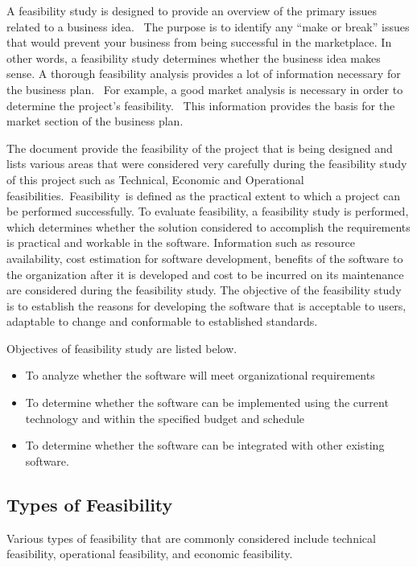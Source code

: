 A feasibility study is designed to provide an overview of the primary issues related to a business idea.  The purpose is to identify any “make or break” issues that would prevent your business from being successful in the marketplace. In other words, a feasibility study determines whether the business idea makes sense. A thorough feasibility analysis provides a lot of information necessary for the business plan.  For example, a good market analysis is necessary in order to determine the project’s feasibility.  This information provides the basis for the market section of the business plan.

The document provide the feasibility of the project that is being designed and lists various areas that were considered very carefully during the feasibility study of this project such as Technical, Economic and Operational feasibilities. Feasibility is defined as the practical extent to which a project can be performed successfully. To evaluate feasibility, a feasibility study is performed, which determines whether the solution considered to accomplish the requirements is practical and workable in the software. Information such as resource availability, cost estimation for software development, benefits of the software to the organization after it is developed and cost to be incurred on its maintenance are considered during the feasibility study. The objective of the feasibility study is to establish the reasons for developing the software that is acceptable to users, adaptable to change and conformable to established standards.

Objectives of feasibility study are listed below.
\begin{itemize}
	\item To analyze whether the software will meet organizational requirements
	\item To determine whether the software can be implemented using the current technology and within the specified budget and schedule
	\item To determine whether the software can be integrated with other existing software.
\end{itemize}

\subsection{Types of Feasibility}
Various types of feasibility that are commonly considered include technical feasibility, operational feasibility, and economic feasibility.

